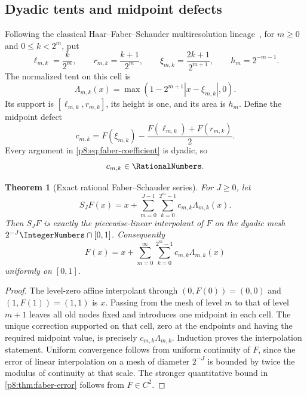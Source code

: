 \documentclass[11pt]{article}
\newtheorem{theorem}{Theorem}[section]
\theoremstyle{definition}
\theoremstyle{remark}
\begin{document}
\subsection{Dyadic tents and midpoint defects}

Following the classical Haar--Faber--Schauder multiresolution lineage~\cite{p8:haar1910,p8:faber1910,p8:schauder1928,p8:deboor2001}, for $m\ge0$ and $0\le k<2^m$, put
\begin{equation}
 \ell_{m,k}=\frac{k}{2^m},\qquad
 r_{m,k}=\frac{k+1}{2^m},\qquad
 \xi_{m,k}=\frac{2k+1}{2^{m+1}},\qquad
 h_m=2^{-m-1}.                                           \label{p8:eq:faber-cell}
\end{equation}
The normalized tent on this cell is
\begin{equation}
 \Lambda_{m,k}(x)=
 \max\!\left(1-2^{m+1}|x-\xi_{m,k}|,0\right).            \label{p8:eq:faber-tent}
\end{equation}
Its support is $[\ell_{m,k},r_{m,k}]$, its height is one,
and its area is $h_m$.  Define the midpoint defect
\begin{equation}
 c_{m,k}=F(\xi_{m,k})-\frac{F(\ell_{m,k})+F(r_{m,k})}{2}. \label{p8:eq:faber-coefficient}
\end{equation}
Every argument in \eqref{p8:eq:faber-coefficient} is dyadic, so
\begin{equation}
 c_{m,k}\in\RationalNumbers.                                           \label{p8:eq:faber-rational}
\end{equation}

\begin{theorem}[Exact rational Faber--Schauder series]
\label{p8:thm:faber-series}
For $J\ge0$, let
\begin{equation}
 S_JF(x)=x+\sum_{m=0}^{J-1}\sum_{k=0}^{2^m-1}
              c_{m,k}\Lambda_{m,k}(x).                   \label{p8:eq:faber-partial}
\end{equation}
Then $S_JF$ is exactly the piecewise-linear interpolant of $F$ on the dyadic
mesh $2^{-J}\IntegerNumbers\cap[0,1]$.  Consequently
\begin{equation}
 \boxed{\displaystyle
 F(x)=x+\sum_{m=0}^\infty\sum_{k=0}^{2^m-1}
 c_{m,k}\Lambda_{m,k}(x)}                               \label{p8:eq:faber-series}
\end{equation}
uniformly on $[0,1]$.
\end{theorem}

\begin{proof}
The level-zero affine interpolant through $(0,F(0))=(0,0)$ and
$(1,F(1))=(1,1)$ is $x$.  Passing from the mesh of level $m$ to that of level
$m+1$ leaves all old nodes fixed and introduces one midpoint in each cell.
The unique correction supported on that cell, zero at the endpoints and
having the required midpoint value, is precisely
$c_{m,k}\Lambda_{m,k}$.  Induction proves the interpolation statement.
Uniform convergence follows from uniform continuity of $F$, since the error
of linear interpolation on a mesh of diameter $2^{-J}$ is bounded by twice
the modulus of continuity at that scale.  The stronger quantitative bound in
\cref{p8:thm:faber-error} follows from $F\in C^2$.
\end{proof}
\end{document}

